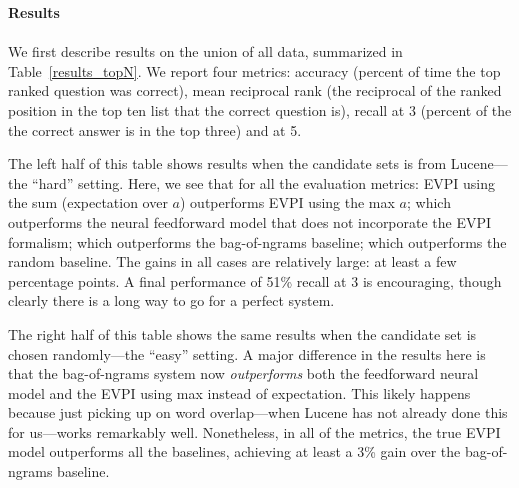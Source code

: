 \documentclass[11pt]{article}
\begin{document}


\textbf{Results}\\\\

We first describe results on the union of all data, summarized in Table~\ref{results_topN}.
We report four metrics: accuracy (percent of time the top ranked question was correct),
mean reciprocal rank (the reciprocal of the ranked position in the top ten list that the correct question is), 
recall at 3 (percent of the the correct answer is in the top three) and
at 5.

The left half of this table shows results when the candidate sets is from Lucene---the ``hard'' setting.
Here, we see that for all the evaluation metrics:
EVPI using the sum (expectation over $a$) outperforms
EVPI using the max $a$;
which outperforms the neural feedforward model that does not incorporate the EVPI formalism;
which outperforms the bag-of-ngrams baseline;
which outperforms the random baseline.
The gains in all cases are relatively large: at least a few percentage points.
A final performance of 51\% recall at 3 is encouraging, though clearly there is a long way to go for a perfect system.

The right half of this table shows the same results when the candidate set is chosen randomly---the ``easy'' setting.
A major difference in the results here is that the bag-of-ngrams system now \emph{outperforms} both the feedforward neural model and the EVPI using max instead of expectation.
This likely happens because just picking up on word overlap---when Lucene has not already done this for us---works remarkably well.
Nonetheless, in all of the metrics, the true EVPI model outperforms all the baselines, achieving at least a 3\% gain over the bag-of-ngrams baseline.
\end{document}
